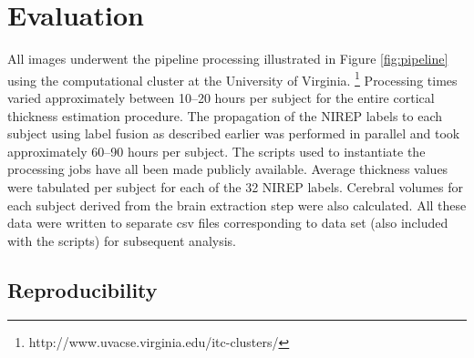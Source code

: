\section{Evaluation}

All images underwent the pipeline processing illustrated in Figure 
\ref{fig:pipeline} using the computational cluster at the University 
of Virginia.%
\footnote{
http://www.uvacse.virginia.edu/itc-clusters/
}  
Processing times varied approximately between 10--20 hours per subject
for the entire cortical thickness estimation procedure.  The propagation of the
NIREP labels to each subject using label fusion as described earlier
was performed in parallel and took approximately 60--90 hours per 
subject.  The scripts used to instantiate the processing jobs have all been made 
publicly available.
Average thickness values were tabulated per subject for each of the
32 NIREP labels.  Cerebral volumes for each subject derived from the brain 
extraction step were also calculated.  All these data were written to separate csv
files corresponding to data set (also included with the scripts) for subsequent 
analysis.

\subsection{Reproducibility}

